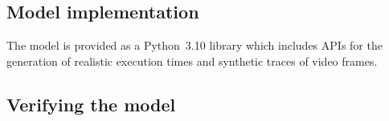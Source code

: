 

\subsection{Model implementation}

The model is provided as a Python~\num{3.10} library which includes \acp{API} for the generation of realistic execution times and synthetic traces of video frames.

\subsection{Verifying the model}